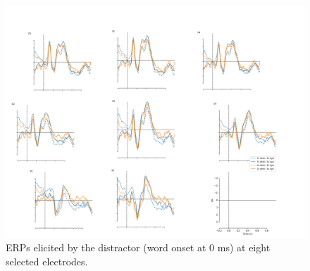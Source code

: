 \documentclass[a4paper, man, floatsintext]{apa7}
\begin{document}
\begin{figure}[H]
    \centering
        \caption{ERPs elicited by the distractor (word onset at 0 ms) at eight selected electrodes.}
    \label{fig:erp_distractor}\includegraphics[width=\textwidth]{images/Distractor_N_100_some_elec.png}
\end{figure}
\end{document}
